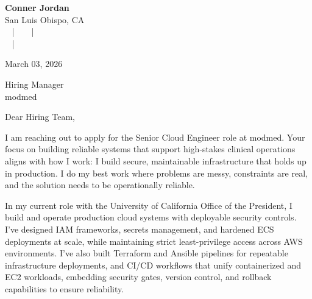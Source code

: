 \documentclass[letterpaper,11pt]{article}
\newcommand{\companyname}{modmed}
\begin{document}
\begin{center}
  {\Huge \textbf{Conner Jordan}}\\[4pt]
  {\Large San Luis Obispo, CA}\\[4pt]
  \href{tel:+18059759793}{
    } ~ | ~
  \href{mailto:connercharlesjordan@gmail.com}{
    } ~ | ~
   \\
  \href{https://www.linkedin.com/in/conner-jordan-4b268514a/}{
    } ~ | ~
  \href{https://github.com/cjordan223}{
    }
\end{center}

\vspace{16pt}

\begin{flushright}
March 03, 2026
\end{flushright}

Hiring Manager\\
\companyname

\vspace{26pt}

\noindent
Dear Hiring Team,

\vspace{16pt}

I am reaching out to apply for the Senior Cloud Engineer role at modmed. Your focus on building reliable systems that support high-stakes clinical operations aligns with how I work: I build secure, maintainable infrastructure that holds up in production. I do my best work where problems are messy, constraints are real, and the solution needs to be operationally reliable.

\vspace{16pt}

In my current role with the University of California Office of the President, I build and operate production cloud systems with deployable security controls. I’ve designed IAM frameworks, secrets management, and hardened ECS deployments at scale, while maintaining strict least-privilege access across AWS environments. I’ve also built Terraform and Ansible pipelines for repeatable infrastructure deployments, and CI/CD workflows that unify containerized and EC2 workloads, embedding security gates, version control, and rollback capabilities to ensure reliability.
\end{document}
